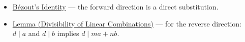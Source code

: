 \begin{remark*}[Dependencies]
\begin{itemize}
    \item \hyperref[thm:bezout-identity]{Bézout's Identity} — the forward
          direction is a direct substitution.
    \item \hyperref[lem:div-linear-combo]{Lemma (Divisibility of Linear
          Combinations)} — for the reverse direction: $d \mid a$ and
          $d \mid b$ implies $d \mid ma + nb$.
\end{itemize}
\end{remark*}